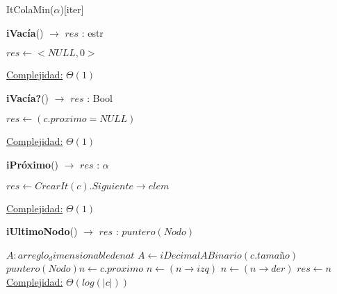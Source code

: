 \begin{Estructura}{ItColaMin($\alpha$)}[iter]
\begin{algorithm}[H]{\textbf{iVacía}() $\to$ $res$ : estr}
    	\begin{algorithmic}[1]
			\State $res \gets <NULL, 0>$ 
			
			\medskip
			\Statex \underline{Complejidad:} $\Theta(1)$
    	\end{algorithmic}
\end{algorithm}

\begin{algorithm}[H]{\textbf{iVacía?}() $\to$ $res$ : Bool}
    	\begin{algorithmic}[1]
			\State $res \gets (c.proximo = NULL)$ 
			
			\medskip
			\Statex \underline{Complejidad:} $\Theta(1)$
    	\end{algorithmic}
\end{algorithm}

\begin{algorithm}[H]{\textbf{iPróximo}() $\to$ $res$ : $\alpha$}
    	\begin{algorithmic}[1]
			\State $res \gets CrearIt(c).Siguiente \rightarrow elem$ 
			
			\medskip
			\Statex \underline{Complejidad:} $\Theta(1)$
    	\end{algorithmic}
\end{algorithm}

\begin{algorithm}[H]{\textbf{iUltimoNodo}() $\to$ $res$ : $puntero(Nodo)$}
    	\begin{algorithmic}[1]
	    	\State $A: arreglo_dimensionable de nat$ 
			\State $A \leftarrow iDecimalABinario(c.tamaño) $ 
			\State $puntero(Nodo) n \gets c.proximo$ 
			 
					\State $n \gets (n \rightarrow izq)$ 
				\Else
					\State $n \gets (n \rightarrow der)$ 
				\EndIf
			\EndFor
			\State $res \gets n $
    	\medskip
		\Statex \underline{Complejidad:} $\Theta(log(|c|))$
    	\end{algorithmic}
\end{algorithm}


\end{Estructura}
